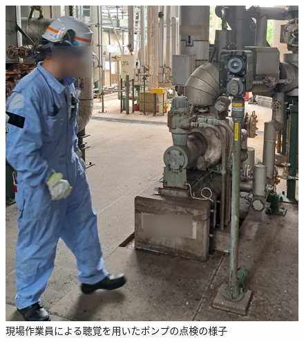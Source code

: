 \documentclass[../main]{subfiles}
\begin{document}
\begin{figure}[t]
  \centering
  \includegraphics[keepaspectratio, width=0.8\linewidth]{chap1/monitoring.png}
  \caption{現場作業員による聴覚を用いたポンプの点検の様子}
  \label{fig:monitoring}
\end{figure}
\end{document}
